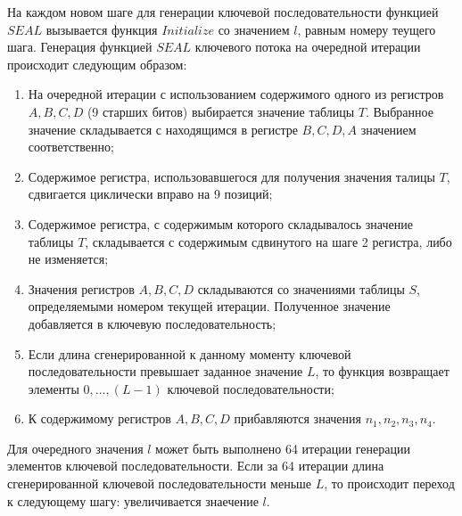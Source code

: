 \documentclass{./civarticle}
\begin{document}
На каждом новом шаге для генерации ключевой последовательности функцией $SEAL$ вызывается функция $Initialize$ со значением $l$, равным номеру теущего шага. Генерация функцией $SEAL$ ключевого потока на очередной итерации происходит следующим образом: 
\begin{enumerate}
    \item На очередной итерации с использованием содержимого одного из регистров $A, B, C, D$ (9 старших битов) выбирается значение таблицы $T$. Выбранное значение складывается с находящимся в регистре $B, C, D, A$ значением соответственно;
    \item Содержимое регистра, использовавшегося для получения значения талицы $T$, сдвигается циклически вправо на 9 позиций;
    \item Содержимое регистра, с содержимым которого складывалось значение таблицы $T$, складывается с содержимым сдвинутого на шаге 2 регистра, либо не изменяется;
    \item Значения регистров $A, B, C, D$ складываются со значениями таблицы $S$, определяемыми номером текущей итерации. Полученное значение добавляется в ключевую последовательность;
    \item Если длина сгенерированной к данному моменту ключевой последовательности превышает заданное значение $L$, то функция возвращает элементы $0, ..., (L-1)$ ключевой последовательности;
    \item К содержимому регистров $A, B, C, D$ прибавляются значения $n_1, n_2, n_3, n_4$.
\end{enumerate}
Для очередного значения $l$ может быть выполнено 64 итерации генерации элементов ключевой последовательности. Если за 64 итерации длина сгенерированной ключевой последовательности меньше $L$, то происходит переход к следующему шагу: увеличивается знаечение $l$.

\begin{figure}[h]
\end{figure}
\end{document}
